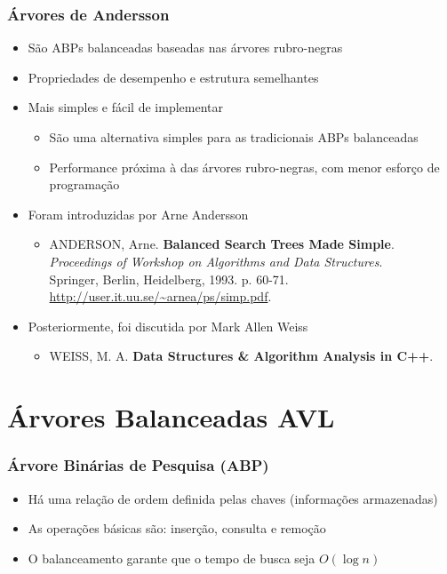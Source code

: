 \documentclass[aspectratio=169]{beamer}
\begin{document}
\begin{frame}\frametitle{Árvores de Andersson}
\begin{itemize}
	\item São ABPs balanceadas baseadas nas árvores rubro-negras\\
	\item Propriedades de desempenho e estrutura semelhantes\\
	\item Mais simples e fácil de implementar
	\begin{itemize}
		\item São uma alternativa simples para as tradicionais ABPs balanceadas
		\item Performance próxima à das árvores rubro-negras, com menor esforço de programação
	\end{itemize}
	\item Foram introduzidas por Arne Andersson
	\begin{itemize}
		\item	ANDERSON, Arne. \textbf{Balanced Search Trees Made Simple}.\\
			\emph{Proceedings of Workshop on Algorithms and Data Structures}.\\
			Springer, Berlin, Heidelberg, 1993. p. 60-71.\\
			\url{http://user.it.uu.se/~arnea/ps/simp.pdf}.
	\end{itemize}
	\item Posteriormente, foi discutida por Mark Allen Weiss
	\begin{itemize}
		\item	WEISS, M. A. \textbf{Data Structures \& Algorithm Analysis in C++}.\\
	\end{itemize}
\end{itemize}
\end{frame}

\section{Árvores Balanceadas AVL}

\begin{frame}\frametitle{Árvore Binárias de Pesquisa (ABP)}
\begin{itemize}
	\item Há uma relação de ordem definida pelas chaves (informações armazenadas)
	\item As operações básicas são: inserção, consulta e remoção
	\item O balanceamento garante que o tempo de busca seja $O(\log{n})$
\end{itemize}
\end{frame}
\end{document}
